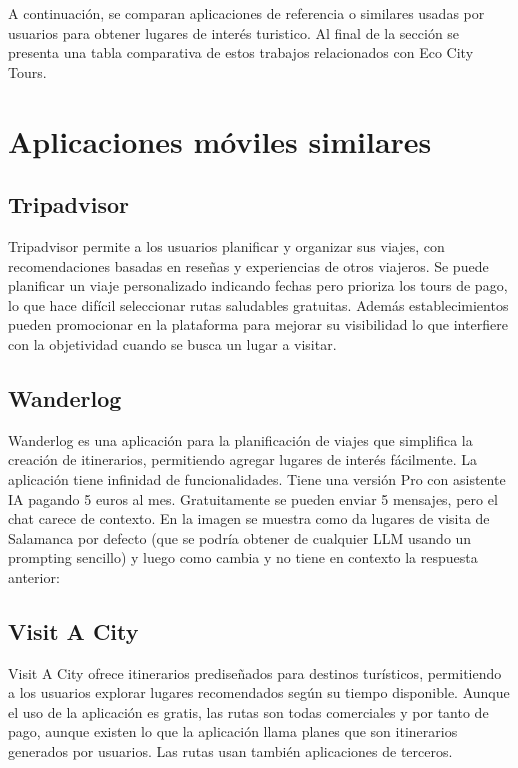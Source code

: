 
A continuación, se comparan aplicaciones de referencia o similares usadas por usuarios para obtener lugares de interés turistico. Al final de la sección se presenta una tabla comparativa de estos trabajos relacionados con Eco City Tours.
\section{Aplicaciones móviles similares}
\subsection{Tripadvisor}
Tripadvisor\cite{tripadvisor} permite a los usuarios planificar y organizar sus viajes, con recomendaciones basadas en reseñas y experiencias de otros viajeros. Se puede planificar un viaje personalizado indicando fechas pero prioriza los tours de pago, lo que hace difícil seleccionar rutas saludables gratuitas. Además establecimientos pueden promocionar en la plataforma para mejorar su visibilidad lo que interfiere con la objetividad cuando se busca un lugar a visitar.

\subsection{Wanderlog}
Wanderlog\cite{wanderlog} es una aplicación para la planificación de viajes que simplifica la creación de itinerarios, permitiendo agregar lugares de interés fácilmente. La aplicación tiene infinidad de funcionalidades. Tiene una versión Pro con asistente IA pagando 5 euros al mes. Gratuitamente se pueden enviar 5 mensajes, pero el chat carece de contexto. En la imagen  se muestra como da lugares de visita de Salamanca por defecto (que se podría obtener de cualquier LLM usando un prompting sencillo) y luego como cambia y no tiene en contexto la respuesta anterior:

\subsection{Visit A City}
Visit A City\cite{visitacity} ofrece itinerarios prediseñados para destinos turísticos, permitiendo a los usuarios explorar lugares recomendados según su tiempo disponible. Aunque el uso de la aplicación es gratis, las rutas son todas comerciales y por tanto de pago, aunque existen lo que la aplicación llama planes que son itinerarios generados por usuarios. Las rutas usan también aplicaciones de terceros.

